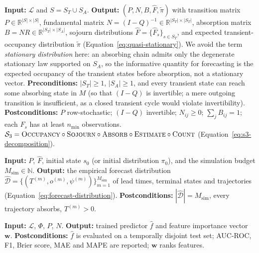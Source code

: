 \begin{definition}
\label{def:contract-s3}
\textbf{Input:} $\mathcal{L}$ and $S = S_T \cup S_A$.
\textbf{Output:} $(P, N, B, \hat{F}, \tilde{\pi})$ with transition matrix
$P \in \mathbb{R}^{|S|\times|S|}$, fundamental matrix
$N = (I-Q)^{-1} \in \mathbb{R}^{|S_T|\times|S_T|}$, absorption matrix
$B = NR \in \mathbb{R}^{|S_T|\times|S_A|}$, sojourn distributions
$\hat{F} = \{\hat{F}_s\}_{s \in S_T}$, and expected transient-occupancy
distribution $\tilde{\pi}$ (Equation~\ref{eq:quasi-stationary}). We avoid
the term \emph{stationary distribution} here: an absorbing chain admits only
the degenerate stationary law supported on $S_A$, so the informative
quantity for forecasting is the expected occupancy of the transient states
before absorption, not a stationary vector.
\textbf{Preconditions:} $|S_T| \geq 1$, $|S_A| \geq 1$, and every transient
state can reach some absorbing state in $M$ (so that $(I-Q)$ is invertible;
a mere outgoing transition is insufficient, as a closed transient cycle
would violate invertibility).
\textbf{Postconditions:} $P$ row-stochastic; $(I-Q)$ invertible;
$N_{ij} \geq 0$; $\sum_j B_{ij} = 1$; each $\hat{F}_s$ has at least
$n_{\min}$ observations.
$\mathcal{S}_3 = \textsc{Occupancy} \circ \textsc{Sojourn} \circ
\textsc{Absorb} \circ \textsc{Estimate} \circ \textsc{Count}$
(Equation~\ref{eq:s3-decomposition}).
\end{definition}

\begin{definition}
\label{def:contract-s4}
\textbf{Input:} $P$, $\hat{F}$, initial state $s_0$ (or initial
distribution $\pi_0$), and the simulation budget
$M_{\text{sim}} \in \mathbb{N}$.
\textbf{Output:} the empirical forecast distribution
$\hat{\mathcal{D}} = \{(T^{(m)}, o^{(m)}, \psi^{(m)})\}_{m=1}^{M_{\text{sim}}}$
of lead times, terminal states and trajectories
(Equation~\ref{eq:forecast-distribution}).
\textbf{Postconditions:} $|\hat{\mathcal{D}}| = M_{\text{sim}}$, every
trajectory absorbs, $T^{(m)} > 0$.
\end{definition}

\begin{definition}
\label{def:contract-ml}
\textbf{Input:} $\mathcal{L}$, $\Phi$, $P$, $N$.
\textbf{Output:} trained predictor $\hat{f}$ and feature importance
vector $\mathbf{w}$.
\textbf{Postconditions:} $\hat{f}$ is evaluated on a temporally disjoint
test set; AUC-ROC, F1, Brier score, MAE and MAPE are reported; $\mathbf{w}$
ranks features.
\end{definition}


